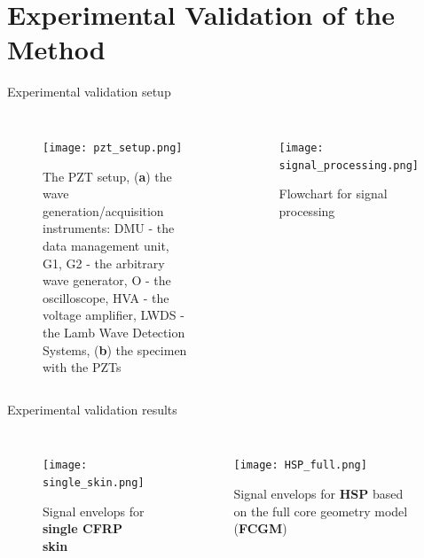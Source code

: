 \documentclass[10pt]{beamer} %
\begin{document}
\section{Experimental Validation of the Method }
\begin{frame}[label=frame12]{Experimental validation setup}
	\begin{columns}[T]
	\begin{figure}
		\texttt{[image: pzt\_setup.png]}
		\caption{The PZT setup, (\textbf{a}) the wave generation/acquisition	instruments: DMU - the data management unit, G1, G2 - the arbitrary wave generator, O - the oscilloscope, HVA - the voltage amplifier, LWDS - the Lamb Wave Detection Systems, (\textbf{b}) the specimen with the PZTs}
		\label{fig:pzt_setup}
	\end{figure}
		\begin{figure}
			\texttt{[image: signal\_processing.png]}
			\caption{Flowchart for signal processing}			\label{fig:signal_processing}
		\end{figure}
	\end{columns}
		
\end{frame}
\begin{frame}[label=frame13]{Experimental validation results}
	\begin{columns}[T]
		\begin{figure}
			\texttt{[image: single\_skin.png]}
			\caption{Signal envelops for \textbf{single CFRP skin}}
			\label{fig:single_skin}
		\end{figure}
		\begin{figure}
			\texttt{[image: HSP\_full.png]}
			\caption{Signal envelops for \textbf{HSP} based on the full core geometry model (\textbf{FCGM})}
			\label{fig:HSP_full}
		\end{figure}
	\end{columns}
\end{frame}
\end{document}
